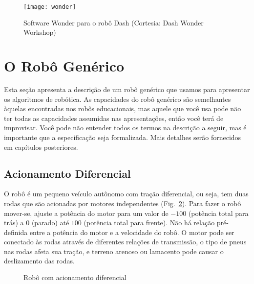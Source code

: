 \begin{figure}
\begin{center}
\texttt{[image: wonder]}
\end{center}
\caption{Software Wonder para o robô Dash (Cortesia: Dash Wonder Workshop)}\label{fig.ide-dash}
\end{figure}

\section{O Robô Genérico}\label{s.generic}

Esta seção apresenta a descrição de um robô genérico que usamos para apresentar os algoritmos de robótica. As capacidades do robô genérico são semelhantes àquelas encontradas nos robôs educacionais, mas aquele que você usa pode não ter todas as capacidades assumidas nas apresentações, então você terá de improvisar. Você pode não entender todos os termos na descrição a seguir, mas é importante que a especificação seja formalizada. Mais detalhes serão fornecidos em capítulos posteriores.

\subsection{Acionamento Diferencial}

O robô é um pequeno veículo autônomo com tração diferencial, ou seja, tem duas rodas que são acionadas por motores independentes (Fig.~\ref{fig.differential}). Para fazer o robô mover-se, ajuste a potência do motor para um valor de $-100$ (potência total para trás) a $0$ (parado) até $100$ (potência total para frente). Não há relação pré-definida entre a potência do motor e a velocidade do robô. O motor pode ser conectado às rodas através de diferentes relações de transmissão, o tipo de pneus nas rodas afeta sua tração, e terreno arenoso ou lamacento pode causar o deslizamento das rodas.

\begin{figure}
\begin{center}
\end{center}
\caption{Robô com acionamento diferencial\label{fig.differential}}
\end{figure}

